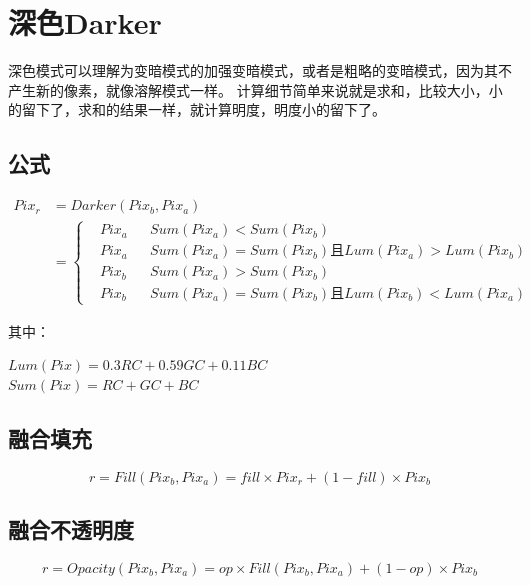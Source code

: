 \newpage
\section{ 深色Darker}

深色模式可以理解为变暗模式的加强变暗模式，或者是粗略的变暗模式，因为其不产生新的像素，就像溶解模式一样。
计算细节简单来说就是求和，比较大小，小的留下了，求和的结果一样，就计算明度，明度小的留下了。

\subsection{ 公式}


\begin{equation}\begin{aligned}
	Pix_r &=Darker(Pix_b,Pix_a)\\&=\left\{\begin{aligned}&Pix_a && Sum(Pix_a)<Sum(Pix_b)\\&Pix_a&&  Sum(Pix_a)=Sum(Pix_b)\text{且}Lum(Pix_a)>Lum(Pix_b)\\&Pix_b&&  Sum(Pix_a)>Sum(Pix_b)\\&Pix_b&&  Sum(Pix_a)=Sum(Pix_b)\text{且}Lum(Pix_b)<Lum(Pix_a)\end{aligned}\right.
\end{aligned}\end{equation}
\begin{notice}
	\item 其中：\begin{flushleft}
		$Lum(Pix) = 0.3RC+0.59GC+0.11BC$\\
		$Sum(Pix) = RC+GC+BC$
	\end{flushleft}
\end{notice}
\subsection{ 融合填充}


\begin{equation}r= Fill(Pix_b,Pix_a) =fill\times Pix_r +(1-fill)\times Pix_b\end{equation}

\subsection{ 融合不透明度}


\begin{equation}r=Opacity(Pix_b,Pix_a)=op\times Fill(Pix_b,Pix_a)+(1-op)\times Pix_b \end{equation}

